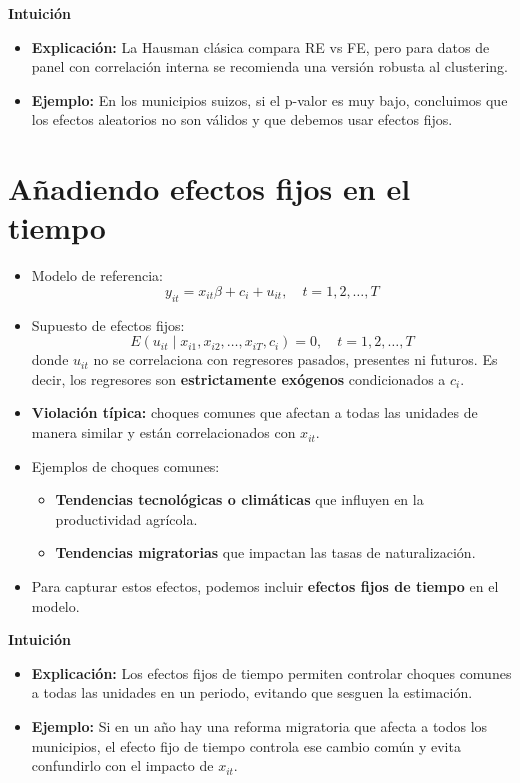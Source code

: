 \documentclass[12pt]{article}
\begin{document}
\noindent\textbf{Intuición}
\begin{itemize}
    \item \textbf{Explicación:} La Hausman clásica compara RE vs FE, pero para datos de panel con correlación interna se recomienda una versión robusta al clustering.
    \item \textbf{Ejemplo:} En los municipios suizos, si el p-valor es muy bajo, concluimos que los efectos aleatorios no son válidos y que debemos usar efectos fijos.
\end{itemize}

\section*{\noindent\textbf{Añadiendo efectos fijos en el tiempo}}

\begin{itemize}
    \item Modelo de referencia:
    \[
    y_{it} = x_{it}\beta + c_i + u_{it}, \quad t = 1,2,\ldots,T
    \]
    
    \item Supuesto de efectos fijos:
    \[
    E(u_{it} \mid x_{i1}, x_{i2}, \ldots, x_{iT}, c_i) = 0, 
    \quad t=1,2,\ldots,T
    \]
    donde $u_{it}$ no se correlaciona con regresores pasados, presentes ni futuros.  
    Es decir, los regresores son \textbf{estrictamente exógenos} condicionados a $c_i$.
    
    \item \textbf{Violación típica:} choques comunes que afectan a todas las unidades de manera similar y están correlacionados con $x_{it}$.
    
    \item Ejemplos de choques comunes:
    \begin{itemize}
        \item \textbf{Tendencias tecnológicas o climáticas} que influyen en la productividad agrícola.
        \item \textbf{Tendencias migratorias} que impactan las tasas de naturalización.
    \end{itemize}
    
    \item Para capturar estos efectos, podemos incluir \textbf{efectos fijos de tiempo} en el modelo.
\end{itemize}

\noindent\textbf{Intuición}
\begin{itemize}
    \item \textbf{Explicación:} Los efectos fijos de tiempo permiten controlar choques comunes a todas las unidades en un periodo, evitando que sesguen la estimación.
    \item \textbf{Ejemplo:} Si en un año hay una reforma migratoria que afecta a todos los municipios, el efecto fijo de tiempo controla ese cambio común y evita confundirlo con el impacto de $x_{it}$.
\end{itemize}
\end{document}

